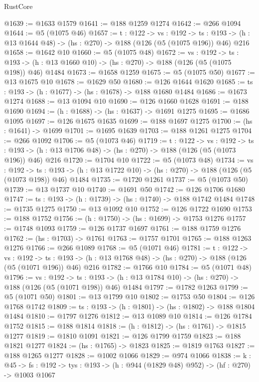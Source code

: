 \begin{lexlean}{RustCore}
\begin{coremodule}
@1639 := @1633 @1579
@1641 := @188 @1259 @1274
@1642 := @266 @1094
@1644 := @5 (@1075 @46)
@1657 := {t : @122} ->
  {vs : @192} ->
  {ts : @193} -> (h : @13 @1644 @48) -> (hs : @270) -> @188 (@126 (@5 (@1075 @196)) @46) @216
@1658 := @1642 @10
@1660 := @5 (@1075 @48)
@1672 := {vs : @192} ->
  {ts : @193} -> (h : @13 @1660 @10) -> (hs : @270) -> @188 (@126 (@5 (@1075 @198)) @46) @1484
@1673 := @1658 @1259
@1675 := @5 (@1075 @50)
@1677 := @13 @1675 @10
@1678 := @1629 @50
@1680 := @126 @1644 @1620
@1685 := {ts : @193} -> (h : @1677) -> (hs : @1678) -> @188 @1680 @1484
@1686 := @1673 @1274
@1688 := @13 @1094 @10
@1690 := @126 @1660 @1628
@1691 := @188 @1690
@1694 := (h : @1688) -> (hs : @1637) -> @1691 @1275
@1695 := @1686 @1095
@1697 := @126 @1675 @1635
@1699 := @188 @1697 @1275
@1700 := (hs : @1641) -> @1699
@1701 := @1695 @1639
@1703 := @188 @1261 @1275
@1704 := @266 @1092
@1706 := @5 (@1073 @46)
@1719 := {t : @122} ->
  {vs : @192} ->
  {ts : @193} -> (h : @13 @1706 @48) -> (hs : @270) -> @188 (@126 (@5 (@1073 @196)) @46) @216
@1720 := @1704 @10
@1722 := @5 (@1073 @48)
@1734 := {vs : @192} ->
  {ts : @193} -> (h : @13 @1722 @10) -> (hs : @270) -> @188 (@126 (@5 (@1073 @198)) @46) @1484
@1735 := @1720 @1261
@1737 := @5 (@1073 @50)
@1739 := @13 @1737 @10
@1740 := @1691 @50
@1742 := @126 @1706 @1680
@1747 := {ts : @193} -> (h : @1739) -> (hs : @1740) -> @188 @1742 @1484
@1748 := @1735 @1275
@1750 := @13 @1092 @10
@1752 := @126 @1722 @1690
@1753 := @188 @1752
@1756 := (h : @1750) -> (hs : @1699) -> @1753 @1276
@1757 := @1748 @1093
@1759 := @126 @1737 @1697
@1761 := @188 @1759 @1276
@1762 := (hs : @1703) -> @1761
@1763 := @1757 @1701
@1765 := @188 @1263 @1276
@1766 := @266 @1089
@1768 := @5 (@1071 @46)
@1781 := {t : @122} ->
  {vs : @192} ->
  {ts : @193} -> (h : @13 @1768 @48) -> (hs : @270) -> @188 (@126 (@5 (@1071 @196)) @46) @216
@1782 := @1766 @10
@1784 := @5 (@1071 @48)
@1796 := {vs : @192} ->
  {ts : @193} -> (h : @13 @1784 @10) -> (hs : @270) -> @188 (@126 (@5 (@1071 @198)) @46) @1484
@1797 := @1782 @1263
@1799 := @5 (@1071 @50)
@1801 := @13 @1799 @10
@1802 := @1753 @50
@1804 := @126 @1768 @1742
@1809 := {ts : @193} -> (h : @1801) -> (hs : @1802) -> @188 @1804 @1484
@1810 := @1797 @1276
@1812 := @13 @1089 @10
@1814 := @126 @1784 @1752
@1815 := @188 @1814
@1818 := (h : @1812) -> (hs : @1761) -> @1815 @1277
@1819 := @1810 @1091
@1821 := @126 @1799 @1759
@1823 := @188 @1821 @1277
@1824 := (hs : @1765) -> @1823
@1825 := @1819 @1763
@1827 := @188 @1265 @1277
@1828 := @1002 @1066
@1829 := @974 @1066
@1838 := {k : @45} ->
  {fs : @192} -> {tys : @193} -> (h : @944 (@1829 @48) @952) -> (hf : @270) -> @1003 @1067

\end{coremodule}
\end{lexlean}
